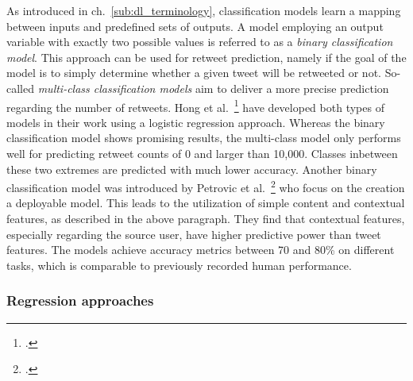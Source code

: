 As introduced in ch.~\ref{sub:dl_terminology}, classification models learn a
mapping between inputs and predefined sets of outputs.
A model employing an output variable with exactly two possible values is referred
to as a \textit{binary classification model}.
This approach can be used for retweet prediction, namely if the goal
of the model is to simply determine whether a given tweet will be retweeted
or not.
So-called \textit{multi-class classification models} aim to deliver a more
precise prediction regarding the number of retweets.
Hong et al.~\footcite{Hong2011} have developed both types of models in their work
using a logistic regression approach.
Whereas the binary classification model shows promising results, the multi-class
model only performs well for predicting retweet counts of 0 and larger than
10,000.
Classes inbetween these two extremes are predicted with much lower accuracy.
Another binary classification model was introduced by Petrovic et al.~\footcite{Petrovic2011}
who focus on the creation a deployable model.
This leads to the utilization of simple content and contextual features, as described
in the above paragraph.
They find that contextual features, especially regarding the source user,
have higher predictive power than tweet features.
The models achieve accuracy metrics between 70 and 80\% on different tasks,
which is comparable to previously recorded human performance.

\subsubsection{Regression approaches}

